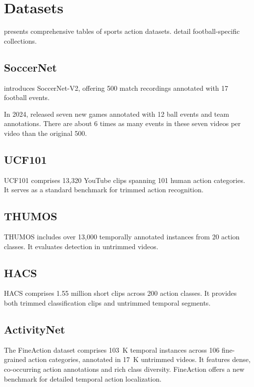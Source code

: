 \section{Datasets}
\label{sec:datasets}

\textcite{survey_of_survey} presents comprehensive tables of sports action datasets. \textcite{seweryn_survey_2023} detail football-specific collections.

\subsection{SoccerNet}

\textcite{deliege_soccernet-v2_dataset_2021} introduces SoccerNet-V2, offering 500 match recordings annotated with 17 football events.

In 2024, \textcite{deliege_soccernet-v2_dataset_2021} released seven new games annotated with 12 ball events and team annotations. There are about 6 times as many events in these seven videos per video than the original 500. 

\subsection{UCF101}
UCF101 \cite{dataset:UCF101} comprises 13,320 YouTube clips spanning 101 human action categories. It serves as a standard benchmark for trimmed action recognition.

\subsection{THUMOS}
THUMOS \cite{dataset:thumos} includes over 13,000 temporally annotated instances from 20 action classes. It evaluates detection in untrimmed videos.

\subsection{HACS}
HACS \cite{dataset:hacs} comprises 1.55 million short clips across 200 action classes. It provides both trimmed classification clips and untrimmed temporal segments.

\subsection{ActivityNet}
The FineAction dataset \cite{dataset:fineaction} comprises 103\, K temporal instances across 106 fine-grained action categories, annotated in 17\, K untrimmed videos. It features dense, co-occurring action annotations and rich class diversity. FineAction offers a new benchmark for detailed temporal action localization.


